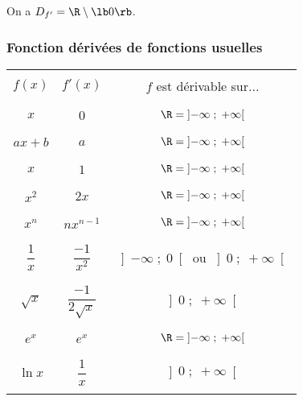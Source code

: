 \vspace*{.3cm}

On a $D_{f'} = \R \setminus \lb 0 \rb $.
 
\vspace*{-5cm}

\newpage

\subsubsection{Fonction dérivées de fonctions usuelles}

\vspace*{.3cm}

\begin{tabular}{|c|c|c|}
\hline
& & \\
$f\left(x\right)$ & $f'\left(x\right)$ & $f$ est dérivable sur... \\
& & \\
\hline
& & \\
$x$ & $0$ & $\R = \left]-\infty \; ; \; +\infty\right[$ \\
& & \\
\hline
& & \\
$ax + b$ & $a$ & $\R = \left]-\infty \; ; \; +\infty\right[$ \\
& & \\
\hline
& & \\
$x$ & $1$ & $\R = \left]-\infty \; ; \; +\infty\right[$ \\
& & \\
\hline
& & \\
$x^2$ & $2x$ & $\R = \left]-\infty \; ; \; +\infty\right[$ \\
& & \\
\hline
& & \\
$x^n$ & $nx^{n-1}$ & $\R = \left]-\infty \; ; \; +\infty\right[$ \\
& & \\
\hline
& & \\
$\dfrac{1}{x}$ & $\dfrac{-1}{x^2}$ & $\left]-\infty \; ; \; 0\right[$ ou $\left]0\; ; \; +\infty\right[$ \\
& & \\
\hline
& & \\
$\sqrt{x}$ & $\dfrac{-1}{2\sqrt{x}}$ & $\left]0\; ; \; +\infty\right[$ \\
& & \\
\hline
& & \\
$e^x$ & $e^x$ & $\R = \left]-\infty \; ; \; +\infty\right[$ \\
& & \\
\hline
& & \\
$\ln x$ & $\dfrac{1}{x}$ & $\left]0 \; ; \; +\infty\right[$ \\
& & \\
\hline
\end{tabular}

